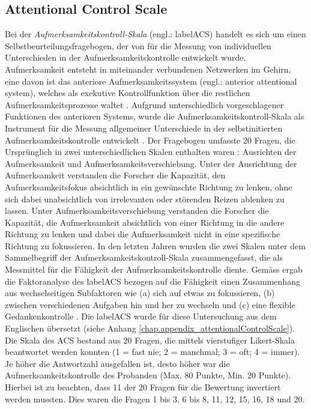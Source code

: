 \subsection{Attentional Control Scale} \label{subsection.acs}
Bei der \textit{Aufmerksamkeitskontroll-Skala} (engl.: \gls{labelACS}) handelt es sich um einen Selbstbeurteilungsfragebogen, der von  für die Messung von individuellen Unterschieden in der Aufmerksamkeitskontrolle entwickelt wurde. Aufmerksamkeit entsteht in miteinander verbundenen Netzwerken im Gehirn, eine davon ist das anteriore Aufmerksamkeitssystem (engl.: anterior attentional system), welches als exekutive Kontrollfunktion über die restlichen Aufmerksamkeitsprozesse waltet \cite{Posner1998}. Aufgrund unterschiedlich vorgeschlagener Funktionen des anterioren Systems, wurde die Aufmerksamkeitskontroll-Skala als Instrument für die Messung allgemeiner Unterschiede in der selbstinitierten Aufmerksamkeitskontrolle entwickelt \cite{Derryberry2001}. Der Fragebogen umfasste 20 Fragen, die Ursprünglich in zwei unterschiedlichen Skalen enthalten waren \cite{Derryberry1988}: Ausrichten der Aufmerksamkeit und Aufmerksamkeitsverschiebung. Unter der Ausrichtung der Aufmerksamkeit verstanden die Forscher die Kapazität, den Aufmerksamkeitsfokus absichtlich in ein gewünschte Richtung zu lenken, ohne sich dabei unabsichtlich von irrelevanten oder störenden Reizen ablenken zu lassen. Unter Aufmerksamkeitsverschiebung verstanden die Forscher die Kapazität, die Aufmerksamkeit absichtlich von einer Richtung in die andere Richtung zu lenken und dabei die Aufmerksamkeit nicht in eine spezifische Richtung zu fokussieren. In den letzten Jahren wurden die zwei Skalen unter dem Sammelbegriff der Aufmerksamkeitskontroll-Skala zusammengefasst, die als Messmittel für die Fähigkeit der Aufmerksamkeitskontrolle diente. Gemäss  ergab die Faktoranalyse des \gls{labelACS} bezogen auf die Fähigkeit einen Zusammenhang aus wechselseitigen Subfaktoren wie (a) sich auf etwas zu fokussieren, (b) zwischen verschiedenen Aufgaben hin und her zu wechseln und (c) eine flexible Gedankenkontrolle \cite{Derryberry2002}. Die \gls{labelACS} wurde für diese Untersuchung aus dem Englischen übersetzt (siehe Anhang \ref{chap.appendix_attentionalControlScale}). Die Skala des ACS bestand aus 20 Fragen, die mittels vierstufiger Likert-Skala beantwortet werden konnten (1 = fast nie; 2 = manchmal; 3 = oft; 4 = immer). Je höher die Antwortzahl ausgefallen ist, desto höher war die Aufmerksamkeitskontrolle des Probanden (Max. 80 Punkte, Min. 20 Punkte). Hierbei ist zu beachten, dass 11 der 20 Fragen für die Bewertung invertiert werden mussten. Dies waren die Fragen 1 bis 3, 6 bis 8, 11, 12, 15, 16, 18 und 20.

